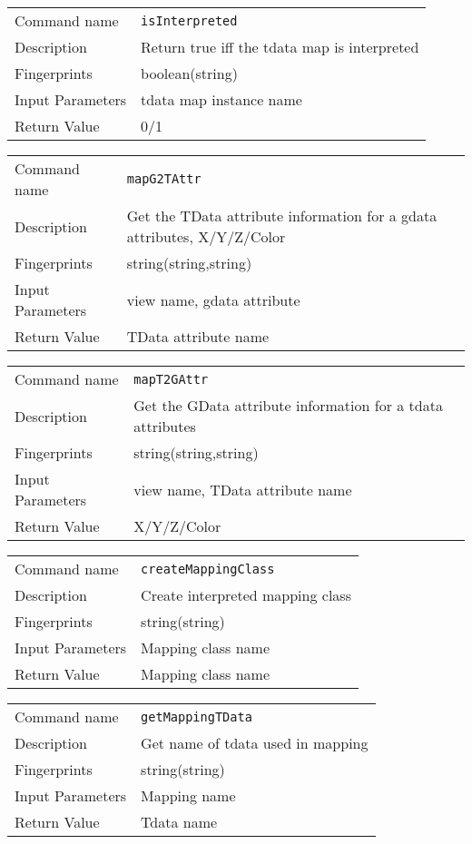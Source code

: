 \noindent
\begin{tabular}{l|p{5in}}
\hline
Command name &{\tt isInterpreted }\\ 
Description &
Return true iff the tdata map is interpreted
 	\\
Fingerprints & boolean(string)\\
Input Parameters&tdata map instance name\\
Return Value&0/1\\
\hline
\end{tabular}
\bigskip

\noindent
\begin{tabular}{l|p{5in}}
\hline
Command name &{\tt mapG2TAttr }\\ 
Description &
Get the TData attribute information for a gdata attributes, X/Y/Z/Color
 	\\
Fingerprints & string(string,string)\\
Input Parameters&view name, gdata attribute\\
Return Value&TData attribute name\\
\hline
\end{tabular}
\bigskip

\noindent
\begin{tabular}{l|p{5in}}
\hline
Command name &{\tt mapT2GAttr }\\ 
Description &
Get the GData attribute information for a tdata attributes
 	\\
Fingerprints & string(string,string)\\
Input Parameters&view name, TData attribute name\\
Return Value&X/Y/Z/Color\\
\hline
\end{tabular}
\bigskip

\noindent
\begin{tabular}{l|p{5in}}
\hline
Command name &{\tt createMappingClass }\\ 
Description &
 Create interpreted mapping class 
 	\\
Fingerprints & string(string)\\
Input Parameters& Mapping class name \\
Return Value& Mapping class name \\
\hline
\end{tabular}
\bigskip

\noindent
\begin{tabular}{l|p{5in}}
\hline
Command name &{\tt getMappingTData }\\ 
Description &
 Get name of tdata used in mapping 
 	\\
Fingerprints & string(string)\\
Input Parameters& Mapping name \\
Return Value& Tdata name \\
\hline
\end{tabular}
\bigskip

